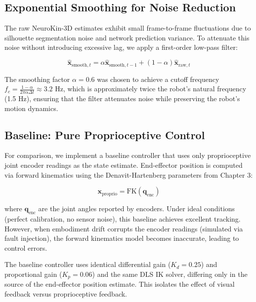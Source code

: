 \documentclass[12pt,a4paper,oneside]{report}
\begin{document}
\subsection{Exponential Smoothing for Noise Reduction}

The raw NeuroKin-3D estimates exhibit small frame-to-frame fluctuations due to silhouette segmentation noise and network prediction variance. To attenuate this noise without introducing excessive lag, we apply a first-order low-pass filter:

\begin{equation}
\hat{\mathbf{x}}_{\text{smooth},t} = \alpha \hat{\mathbf{x}}_{\text{smooth},t-1} + (1 - \alpha) \hat{\mathbf{x}}_{\text{raw},t}
\end{equation}

The smoothing factor $\alpha = 0.6$ was chosen to achieve a cutoff frequency $f_c = \frac{1-\alpha}{2\pi \alpha \Delta t} \approx 3.2$ Hz, which is approximately twice the robot's natural frequency (1.5 Hz), ensuring that the filter attenuates noise while preserving the robot's motion dynamics.

\subsection{Baseline: Pure Proprioceptive Control}

For comparison, we implement a baseline controller that uses only proprioceptive joint encoder readings as the state estimate. End-effector position is computed via forward kinematics using the Denavit-Hartenberg parameters from Chapter 3:

\begin{equation}
\mathbf{x}_{\text{proprio}} = \text{FK}(\mathbf{q}_{\text{enc}})
\end{equation}

where $\mathbf{q}_{\text{enc}}$ are the joint angles reported by encoders. Under ideal conditions (perfect calibration, no sensor noise), this baseline achieves excellent tracking. However, when embodiment drift corrupts the encoder readings (simulated via fault injection), the forward kinematics model becomes inaccurate, leading to control errors.

The baseline controller uses identical differential gain ($K_d = 0.25$) and proportional gain ($K_p = 0.06$) and the same DLS IK solver, differing only in the source of the end-effector position estimate. This isolates the effect of visual feedback versus proprioceptive feedback.
\end{document}
